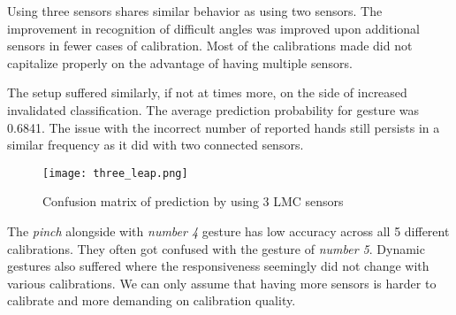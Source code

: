 Using three sensors shares similar behavior as using two sensors. The improvement in recognition of difficult angles was improved upon additional sensors in fewer cases of calibration. Most of the calibrations made did not capitalize properly on the advantage of having multiple sensors. 

The setup suffered similarly, if not at times more, on the side of increased invalidated classification. The average prediction probability for gesture was 0.6841. The issue with the incorrect number of reported hands still persists in a similar frequency as it did with two connected sensors.

\begin{figure}[ht]
    \centering
    \texttt{[image: three\_leap.png]}
    \caption{Confusion matrix of prediction by using 3 LMC sensors}
    \label{fig:confuse_3}
\end{figure}

The \textit{pinch} alongside with \textit{number 4} gesture has low accuracy across all 5 different calibrations. They often got confused with the gesture of \textit{number 5}. Dynamic gestures also suffered where the responsiveness seemingly did not change with various calibrations. We can only assume that having more sensors is harder to calibrate and more demanding on calibration quality.



